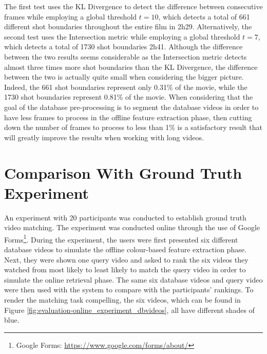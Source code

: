 The first test uses the KL Divergence to detect the difference between consecutive frames while employing a global threshold $t=10$, which detects a total of 661 different shot boundaries throughout the entire film in 2h29. Alternatively, the second test uses the Intersection metric while employing a global threshold $t=7$, which detects a total of 1730 shot boundaries 2h41. Although the difference between the two results seems considerable as the Intersection metric detects almost three times more shot boundaries than the KL Divergence, the difference between the two is actually quite small when considering the bigger picture. Indeed, the 661 shot boundaries represent only 0.31\% of the movie, while the 1730 shot boundaries represent 0.81\% of the movie. When considering that the goal of the database pre-processing is to segment the database videos in order to have less frames to process in the offline feature extraction phase, then cutting down the number of frames to process to less than 1\% is a satisfactory result that will greatly improve the results when working with long videos.\\



\section{Comparison With Ground Truth Experiment}

An experiment with 20 participants was conducted to establish ground truth video matching. The experiment was conducted online through the use of Google Forms\footnote{Google Forms: \url{https://www.google.com/forms/about/}}. During the experiment, the users were first presented six different database videos to simulate the offline colour-based feature extraction phase. Next, they were shown one query video and asked to rank the six videos they watched from most likely to least likely to match the query video in order to simulate the online retrieval phase. The same six database videos and query video were then used with the system to compare with the participants' rankings. To render the matching task compelling, the six videos, which can be found in Figure \ref{fig:evaluation-online_experiment_dbvideos}, all have different shades of blue.

